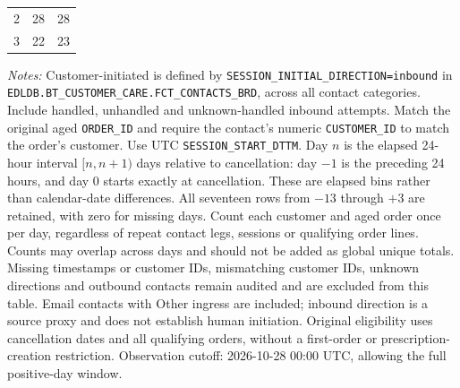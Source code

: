 \begin{table}[!htbp]
\begin{tabular}{@{}rrr@{}}
2 & 28 & 28 \\

3 & 22 & 23 \\
\bottomrule
\end{tabular}

\begin{minipage}{\linewidth}
\footnotesize
\textit{Notes:} Customer-initiated is defined by
\texttt{SESSION\_INITIAL\_DIRECTION=inbound} in
\texttt{EDLDB.BT\_CUSTOMER\_CARE.FCT\_CONTACTS\_BRD}, across all contact
categories. Include handled, unhandled and unknown-handled inbound attempts. Match the original aged \texttt{ORDER\_ID} and require
the contact's numeric \texttt{CUSTOMER\_ID} to match the order's customer.
Use UTC \texttt{SESSION\_START\_DTTM}. Day $n$ is the elapsed 24-hour interval
$[n,n+1)$ days relative to cancellation: day $-1$ is the preceding 24 hours,
and day $0$ starts exactly at cancellation. These are elapsed bins rather
than calendar-date differences. All seventeen rows from $-13$ through $+3$
are retained, with zero for missing days. Count each customer and aged order
once per day, regardless of repeat contact legs, sessions or qualifying order
lines. Counts may overlap across days and should not be added as global unique
totals. Missing timestamps or customer IDs, mismatching customer IDs, unknown
directions and outbound contacts remain audited and are excluded from this
table. Email contacts with Other ingress are included; inbound direction is
a source proxy and does not establish human initiation.
Original eligibility uses cancellation
dates and all qualifying orders, without a first-order or prescription-creation
restriction. Observation cutoff: 2026-10-28 00:00 UTC, allowing the full positive-day window.
\end{minipage}
\end{table}
